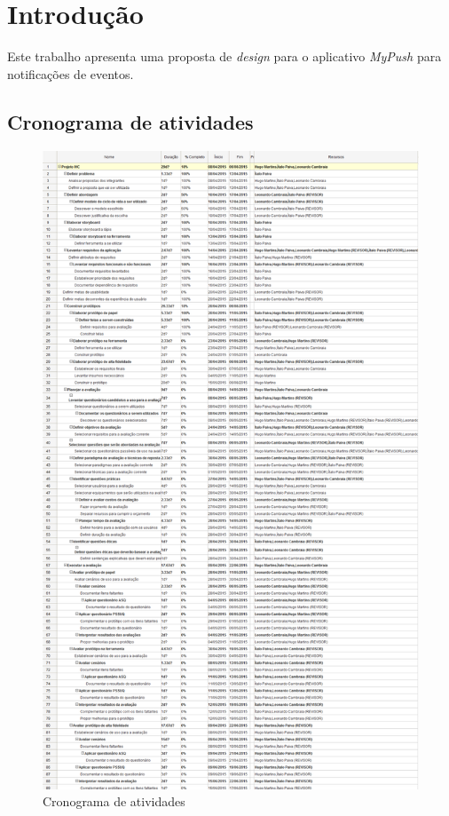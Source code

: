 \chapter[Introdução]{Introdução}

  Este trabalho apresenta uma proposta de \textit{design} para o aplicativo \textit{MyPush} para notificações de eventos.
  
  \pagebreak
  \section{Cronograma de atividades}
    
    \begin{figure}[!htbp]
      \centering
      \includegraphics[scale=0.3]{editaveis/figuras/cronograma}
      \caption{Cronograma de atividades}
      \label{cronograma}
    \end{figure}




